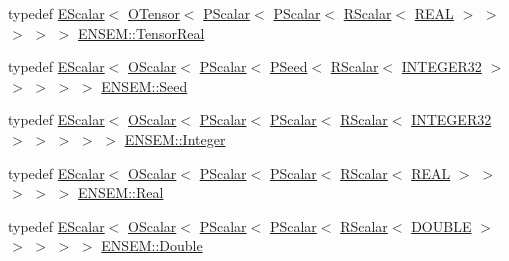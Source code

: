 \begin{DoxyCompactItemize}
\item 
typedef \mbox{\hyperlink{classENSEM_1_1EScalar}{E\+Scalar}}$<$ \mbox{\hyperlink{classENSEM_1_1OTensor}{O\+Tensor}}$<$ \mbox{\hyperlink{classENSEM_1_1PScalar}{P\+Scalar}}$<$ \mbox{\hyperlink{classENSEM_1_1PScalar}{P\+Scalar}}$<$ \mbox{\hyperlink{classENSEM_1_1RScalar}{R\+Scalar}}$<$ \mbox{\hyperlink{namespaceENSEM_a6dd9aa6508168f545c861787e63ddd1e}{R\+E\+AL}} $>$ $>$ $>$ $>$ $>$ \mbox{\hyperlink{group__defs_ga958dd8b23f0fe048624bd04c42201408}{E\+N\+S\+E\+M\+::\+Tensor\+Real}}
\item 
typedef \mbox{\hyperlink{classENSEM_1_1EScalar}{E\+Scalar}}$<$ \mbox{\hyperlink{classENSEM_1_1OScalar}{O\+Scalar}}$<$ \mbox{\hyperlink{classENSEM_1_1PScalar}{P\+Scalar}}$<$ \mbox{\hyperlink{classENSEM_1_1PSeed}{P\+Seed}}$<$ \mbox{\hyperlink{classENSEM_1_1RScalar}{R\+Scalar}}$<$ \mbox{\hyperlink{namespaceENSEM_a6a58e5c07422c48c5d547184b36719bf}{I\+N\+T\+E\+G\+E\+R32}} $>$ $>$ $>$ $>$ $>$ \mbox{\hyperlink{group__defs_ga8a5a983ab64ca8f6a5419885bacd4c40}{E\+N\+S\+E\+M\+::\+Seed}}
\item 
typedef \mbox{\hyperlink{classENSEM_1_1EScalar}{E\+Scalar}}$<$ \mbox{\hyperlink{classENSEM_1_1OScalar}{O\+Scalar}}$<$ \mbox{\hyperlink{classENSEM_1_1PScalar}{P\+Scalar}}$<$ \mbox{\hyperlink{classENSEM_1_1PScalar}{P\+Scalar}}$<$ \mbox{\hyperlink{classENSEM_1_1RScalar}{R\+Scalar}}$<$ \mbox{\hyperlink{namespaceENSEM_a6a58e5c07422c48c5d547184b36719bf}{I\+N\+T\+E\+G\+E\+R32}} $>$ $>$ $>$ $>$ $>$ \mbox{\hyperlink{group__defs_gab13d060149cdd80ab40fd8d653f60117}{E\+N\+S\+E\+M\+::\+Integer}}
\item 
typedef \mbox{\hyperlink{classENSEM_1_1EScalar}{E\+Scalar}}$<$ \mbox{\hyperlink{classENSEM_1_1OScalar}{O\+Scalar}}$<$ \mbox{\hyperlink{classENSEM_1_1PScalar}{P\+Scalar}}$<$ \mbox{\hyperlink{classENSEM_1_1PScalar}{P\+Scalar}}$<$ \mbox{\hyperlink{classENSEM_1_1RScalar}{R\+Scalar}}$<$ \mbox{\hyperlink{namespaceENSEM_a6dd9aa6508168f545c861787e63ddd1e}{R\+E\+AL}} $>$ $>$ $>$ $>$ $>$ \mbox{\hyperlink{group__defs_ga5483719647f0554b19174079436486fa}{E\+N\+S\+E\+M\+::\+Real}}
\item 
typedef \mbox{\hyperlink{classENSEM_1_1EScalar}{E\+Scalar}}$<$ \mbox{\hyperlink{classENSEM_1_1OScalar}{O\+Scalar}}$<$ \mbox{\hyperlink{classENSEM_1_1PScalar}{P\+Scalar}}$<$ \mbox{\hyperlink{classENSEM_1_1PScalar}{P\+Scalar}}$<$ \mbox{\hyperlink{classENSEM_1_1RScalar}{R\+Scalar}}$<$ \mbox{\hyperlink{namespaceENSEM_adcbd0de4e9e0e7ef6aa9b681a554e2c5}{D\+O\+U\+B\+LE}} $>$ $>$ $>$ $>$ $>$ \mbox{\hyperlink{group__defs_ga491906b5e5ffc41e1ec145d6ad29eb8b}{E\+N\+S\+E\+M\+::\+Double}}

\end{DoxyCompactItemize}
